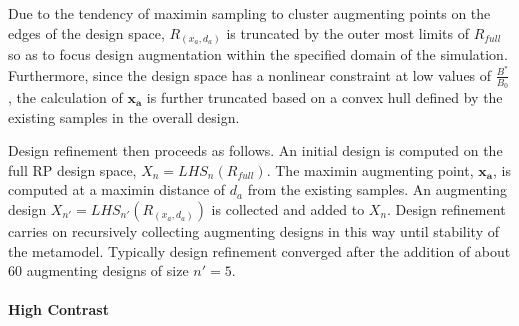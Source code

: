 %
Due to the tendency of maximin sampling to cluster augmenting points on the edges
of the design space, $R_{(x_a, d_a)}$ is truncated by the outer most limits of
$R_{full}$ so as to focus design augmentation within the specified domain of the
simulation. Furthermore, since the design space has a nonlinear constraint at low
values of $\frac{B^*}{B_0}$, the calculation of $\bm{x_a}$ is further truncated
based on a convex hull defined by the existing samples in the overall design.

%
Design refinement then proceeds as follows. An initial design is computed on the 
full RP design space, $X_{n} = LHS_{n}(R_{full})$. %
The maximin augmenting point, $\bm{x_a}$, is computed at a maximin distance of $d_a$ 
from the existing samples. An augmenting design $X_{n'} = LHS_{n'}(R_{(x_a, d_a)})$ 
is collected and added to $X_n$. Design refinement carries on recursively 
collecting augmenting designs in this way until %
stability of the metamodel. Typically design refinement converged after the 
addition of about 60 augmenting designs of size $n'=5$.

%
\paragraph{High Contrast}

